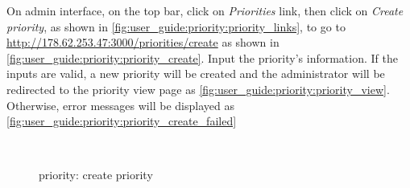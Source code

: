 On admin interface, on the top bar, click on \emph{Priorities} link, then click on \emph{Create priority}, as shown in \autoref{fig:user_guide:priority:priority_links}, 
to go to \href{http://178.62.253.47:3000/priorities/create}{http://178.62.253.47:3000/priorities/create} as shown in \autoref{fig:user_guide:priority:priority_create}.
Input the priority's information.
If the inputs are valid, a new priority will be created and the administrator will be redirected to the priority view page as \autoref{fig:user_guide:priority:priority_view}.
Otherwise, error messages will be displayed as \autoref{fig:user_guide:priority:priority_create_failed}

\begin{figure}[bth]
\myfloatalign
{} \quad
{} \\
\caption[Priority: create priority]{priority: create priority}
\label{fig:user_guide:priority:priority_create}
\end{figure}

